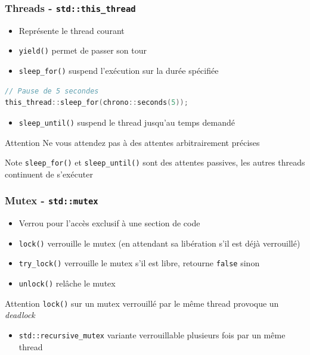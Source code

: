 \documentclass[C++.tex]{subfiles}
\begin{document}
\begin{frame}[fragile]
	\frametitle{Threads - \lstinline|std::this_thread|}
	\begin{itemize}
		\item Représente le thread courant
		\item \lstinline|yield()| permet de \og passer son tour\fg{}


		\item \lstinline|sleep_for()| suspend l'exécution sur la durée spécifiée
	\end{itemize}

	\begin{lstlisting}[language=C++]
// Pause de 5 secondes
this_thread::sleep_for(chrono::seconds(5));\end{lstlisting}

	\begin{itemize}
		\item \lstinline|sleep_until()| suspend le thread jusqu'au temps demandé
	\end{itemize}

	\begin{alertblock}{Attention}
		Ne vous attendez pas à des attentes arbitrairement précises

	\end{alertblock}

	\begin{block}{Note}
		\lstinline|sleep_for()| et \lstinline|sleep_until()| sont des attentes passives, les autres threads continuent de s'exécuter
	\end{block}
\end{frame}

\begin{frame}[fragile]
	\frametitle{Mutex - \lstinline|std::mutex|}
	\begin{itemize}
		\item Verrou pour l'accès exclusif à une section de code
		\item \lstinline|lock()| verrouille le mutex (en attendant sa libération s'il est déjà verrouillé)
		\item \lstinline|try_lock()| verrouille le mutex s'il est libre, retourne \lstinline|false| sinon
		\item \lstinline|unlock()| relâche le mutex
	\end{itemize}

	\begin{alertblock}{Attention}
		\lstinline|lock()| sur un mutex verrouillé par le même thread provoque un \textit{deadlock}
	\end{alertblock}

	\begin{itemize}
		\item \lstinline|std::recursive_mutex| variante verrouillable plusieurs fois par un même thread

	\end{itemize}
\end{frame}
\end{document}
